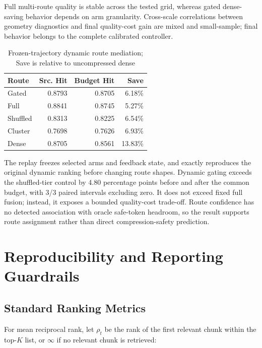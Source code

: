 Full multi-route quality is stable across the tested grid, whereas gated dense-saving behavior depends on arm granularity. Cross-scale correlations between geometry diagnostics and final quality-cost gain are mixed and small-sample; final behavior belongs to the complete calibrated controller.

\begin{table}[tbp]
\centering
\small
\caption{Frozen-trajectory dynamic route mediation; Save is relative to uncompressed dense}
\label{tab:s21}
\begin{tabular}{lrrr}
\toprule
Route & Src. Hit & Budget Hit & Save \\
\midrule
Gated & 0.8793 & 0.8705 & 6.18\% \\
Full & 0.8841 & 0.8745 & 5.27\% \\
Shuffled & 0.8313 & 0.8225 & 6.54\% \\
Cluster & 0.7698 & 0.7626 & 6.93\% \\
Dense & 0.8705 & 0.8561 & 13.83\% \\
\bottomrule
\end{tabular}
\end{table}

The replay freezes selected arms and feedback state, and exactly reproduces the original dynamic ranking before changing route shapes. Dynamic gating exceeds the shuffled-tier control by 4.80 percentage points before and after the common budget, with 3/3 paired intervals excluding zero. It does not exceed fixed full fusion; instead, it exposes a bounded quality-cost trade-off. Route confidence has no detected association with oracle safe-token headroom, so the result supports route assignment rather than direct compression-safety prediction.

\section{Reproducibility and Reporting Guardrails}
\label{sec:12-appendix:reproducibility-and-reporting-guardrails}

\subsection{Standard Ranking Metrics}
\label{sec:12-appendix:standard-ranking-metrics}

For mean reciprocal rank, let $\rho_t$ be the rank of the first relevant chunk within the top-$K$ list, or $\infty$ if no relevant chunk is retrieved:

